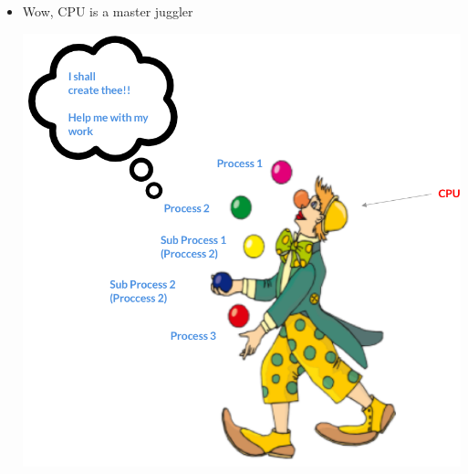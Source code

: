 \documentclass[12pt]{article}
\begin{document}
\begin{itemize}
\begin{itemize}
        \begin{itemize}
            \item Wow, CPU is a master juggler

            \begin{center}
            \includegraphics[width=\linewidth]{../images/week_1_notes_1_9.png}
            \end{center}
        \end{itemize}


\end{itemize}
\end{itemize}
\end{document}
